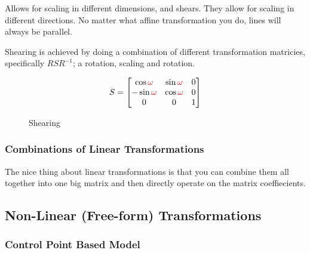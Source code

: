 \documentclass[11pt]{article}
\begin{document}
Allows for scaling in different dimensions, and shears. They allow for scaling in different directions. No matter what affine transformation you do, lines will always be parallel.

Shearing is achieved by doing a combination of different transformation matricies, specifically $RSR^{-1}$; a rotation, scaling and rotation.

\begin{equation*}
    S = \begin{bmatrix}
        \cos \color{red}{\omega} & \sin \color{red}{\omega} & 0 \\ 
        -\sin \color{red}{\omega} & \cos \color{red}{\omega} & 0 \\ 
        0 & 0 & 1
    \end{bmatrix}
\end{equation*}

\begin{figure}[H]
    \centering
    \caption*{Shearing}
\end{figure}

\subsubsection{Combinations of Linear Transformations}

The nice thing about linear transformations is that you can combine them all together into one big matrix and then directly operate on the matrix coeffiecients.

\subsection{Non-Linear (Free-form) Transformations}

\subsubsection{Control Point Based Model}
\end{document}

